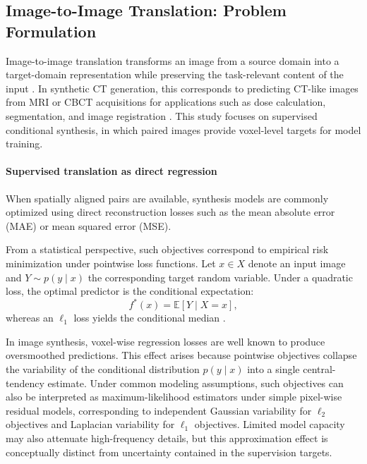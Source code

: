 \documentclass[lettersize,journal]{IEEEtran}
\begin{document}
\subsection{Image-to-Image Translation: Problem Formulation}
\label{sec:i2i_background}

Image-to-image translation transforms an image from a source domain into a target-domain representation while preserving the task-relevant content of the input \cite{mcnaughton2023machine,kaji2019overview}. In synthetic CT generation, this corresponds to predicting CT-like images from MRI or CBCT acquisitions for applications such as dose calculation, segmentation, and image registration \cite{roh2024ct,liu2021ct,dowling2022image,altalib2025synthetic}. This study focuses on supervised conditional synthesis, in which paired images provide voxel-level targets for model training.

\paragraph{Supervised translation as direct regression}
When spatially aligned pairs are available, synthesis models are commonly optimized using direct reconstruction losses such as the mean absolute error (MAE) or mean squared error (MSE).

From a statistical perspective, such objectives correspond to empirical risk minimization under pointwise loss functions. Let $x \in X$ denote an input image and $Y \sim p(y \mid x)$ the corresponding target random variable. Under a quadratic loss, the optimal predictor is the conditional expectation:
\begin{equation}
f^*(x) = \mathbb{E}[Y \mid X = x],
\end{equation}
whereas an $\ell_1$ loss yields the conditional median \cite{bishop2006pattern,koenker2001quantile}.

In image synthesis, voxel-wise regression losses are well known to produce oversmoothed predictions. This effect arises because pointwise objectives collapse the variability of the conditional distribution $p(y \mid x)$ into a single central-tendency estimate. Under common modeling assumptions, such objectives can also be interpreted as maximum-likelihood estimators under simple pixel-wise residual models, corresponding to independent Gaussian variability for $\ell_2$ objectives and Laplacian variability for $\ell_1$ objectives. Limited model capacity may also attenuate high-frequency details, but this approximation effect is conceptually distinct from uncertainty contained in the supervision targets.
\end{document}
